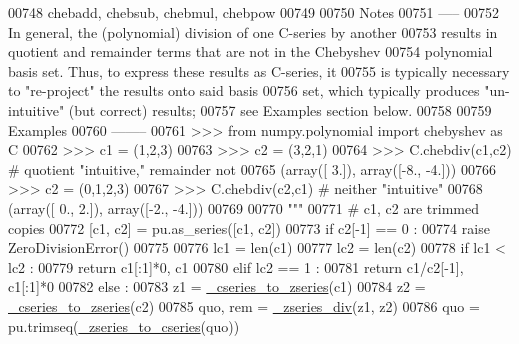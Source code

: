 \begin{DoxyCode}
00748 \textcolor{stringliteral}{    chebadd, chebsub, chebmul, chebpow}
00749 \textcolor{stringliteral}{}
00750 \textcolor{stringliteral}{    Notes}
00751 \textcolor{stringliteral}{    -----}
00752 \textcolor{stringliteral}{    In general, the (polynomial) division of one C-series by another}
00753 \textcolor{stringliteral}{    results in quotient and remainder terms that are not in the Chebyshev}
00754 \textcolor{stringliteral}{    polynomial basis set.  Thus, to express these results as C-series, it}
00755 \textcolor{stringliteral}{    is typically necessary to "re-project" the results onto said basis}
00756 \textcolor{stringliteral}{    set, which typically produces "un-intuitive" (but correct) results;}
00757 \textcolor{stringliteral}{    see Examples section below.}
00758 \textcolor{stringliteral}{}
00759 \textcolor{stringliteral}{    Examples}
00760 \textcolor{stringliteral}{    --------}
00761 \textcolor{stringliteral}{    >>> from numpy.polynomial import chebyshev as C}
00762 \textcolor{stringliteral}{    >>> c1 = (1,2,3)}
00763 \textcolor{stringliteral}{    >>> c2 = (3,2,1)}
00764 \textcolor{stringliteral}{    >>> C.chebdiv(c1,c2) # quotient "intuitive," remainder not}
00765 \textcolor{stringliteral}{    (array([ 3.]), array([-8., -4.]))}
00766 \textcolor{stringliteral}{    >>> c2 = (0,1,2,3)}
00767 \textcolor{stringliteral}{    >>> C.chebdiv(c2,c1) # neither "intuitive"}
00768 \textcolor{stringliteral}{    (array([ 0.,  2.]), array([-2., -4.]))}
00769 \textcolor{stringliteral}{}
00770 \textcolor{stringliteral}{    """}
00771     \textcolor{comment}{# c1, c2 are trimmed copies}
00772     [c1, c2] = pu.as\_series([c1, c2])
00773     \textcolor{keywordflow}{if} c2[-1] == 0 :
00774         \textcolor{keywordflow}{raise} ZeroDivisionError()
00775 
00776     lc1 = len(c1)
00777     lc2 = len(c2)
00778     \textcolor{keywordflow}{if} lc1 < lc2 :
00779         \textcolor{keywordflow}{return} c1[:1]*0, c1
00780     \textcolor{keywordflow}{elif} lc2 == 1 :
00781         \textcolor{keywordflow}{return} c1/c2[-1], c1[:1]*0
00782     \textcolor{keywordflow}{else} :
00783         z1 = \hyperlink{namespacepyneb_1_1utils_1_1chebyshev_a659e346f7cdd9fd058850b26f7e95b17}{\_cseries\_to\_zseries}(c1)
00784         z2 = \hyperlink{namespacepyneb_1_1utils_1_1chebyshev_a659e346f7cdd9fd058850b26f7e95b17}{\_cseries\_to\_zseries}(c2)
00785         quo, rem = \hyperlink{namespacepyneb_1_1utils_1_1chebyshev_ad00f2653194746fa98c3421eb7c26f2c}{\_zseries\_div}(z1, z2)
00786         quo = pu.trimseq(\hyperlink{namespacepyneb_1_1utils_1_1chebyshev_a2a88474ce0ea12fb26f82b7116752dc1}{\_zseries\_to\_cseries}(quo))

\end{DoxyCode}
